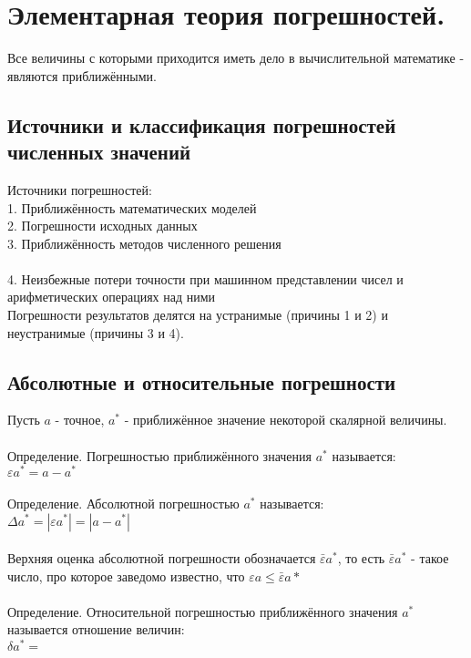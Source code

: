 \documentclass[a4paper]{article}
\begin{document}
\section*{Элементарная теория погрешностей.}
\setcounter{section}{1}
Все величины с которыми приходится иметь дело в вычислительной математике - являются приближёнными.\\
\subsection{Источники и классификация погрешностей численных значений}%
\setcounter{subsection}{2}
Источники погрешностей:\\
1. Приближённость математических моделей\\
2. Погрешности исходных данных\\
3. Приближённость методов численного решения\\\\
4. Неизбежные потери точности при машинном представлении чисел и арифметических операциях над ними\\
Погрешности результатов делятся на устранимые (причины 1 и 2) и неустранимые (причины 3 и 4). 
\subsection{Абсолютные и относительные погрешности}%
\setcounter{subsubsection}{3}
Пусть $a$ - точное, $a^*$ - приближённое значение некоторой скалярной величины.\\\\
Определение. Погрешностью приближённого значения $a^*$ называется:\\
$\varepsilon a^* = a - a^*$\\\\
Определение. Абсолютной погрешностью $a^*$ называется:\\
$\Delta a^* = |\varepsilon a^*| = |a - a^*|$\\\\
Верхняя оценка абсолютной погрешности обозначается $\bar{\varepsilon}a^*$, то есть $\bar{\varepsilon}a^*$ - такое число, про которое заведомо известно, что $\varepsilon a \leq \bar{\varepsilon} a*$\\\\
Определение. Относительной погрешностью приближённого значения $a^*$ называется отношение величин:\\
$\delta a^* = \frac{}{}$\\
\end{document}
